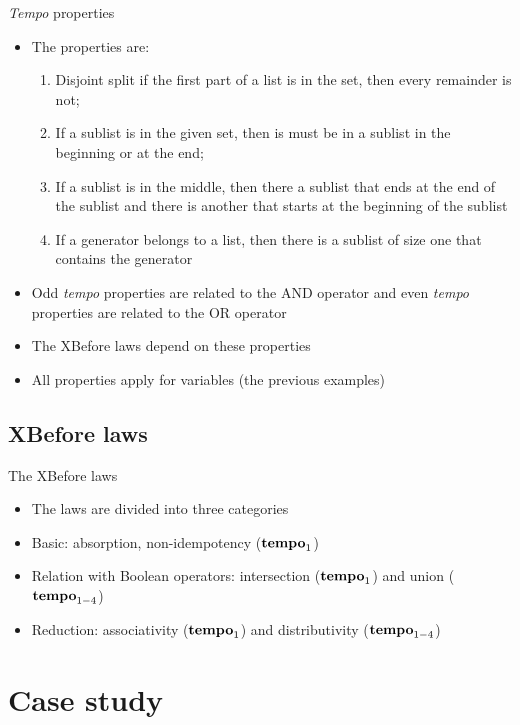 \documentclass{beamer}
\def\tempoop{\ensuremath\operatorname{\mathbf{tempo}}}
\newcommand{\tempo}[2][1-4]{\ensuremath\tempoop_{#1} #2}
\begin{document}
\begin{frame}[label=tempo]{\emph{Tempo} properties}
	\begin{itemize}
		\item The properties are:
		\begin{enumerate}
			\item Disjoint split if the first part of a list is in the set, then every remainder is not;
			\item If a sublist is in the given set, then is must be in a sublist in the beginning or at the end;
			\item If a sublist is in the middle, then there a sublist that ends at the end of the sublist and there is another that starts at the beginning of the sublist
			\item If a generator belongs to a list, then there is a sublist of size one that contains the generator
		\end{enumerate}
		\item Odd \emph{tempo} properties are related to the AND operator and even \emph{tempo} properties are related to the OR operator
		\item The XBefore laws depend on these properties
		\item All properties apply for variables (the previous examples)
	\end{itemize}
	\hyperlink{tempodetail}{}
\end{frame}

\subsection{XBefore laws}

\begin{frame}{The XBefore laws}
	\begin{itemize}
		\item The laws are divided into three categories
		\item Basic: absorption, non-idempotency ($\tempo[1]$)
		\item Relation with Boolean operators: intersection ($\tempo[1]$) and union ($\tempo$)
		\item Reduction: associativity ($\tempo[1]$) and distributivity ($\tempo$)
	\end{itemize}
\end{frame}

\section{Case study}
\end{document}
